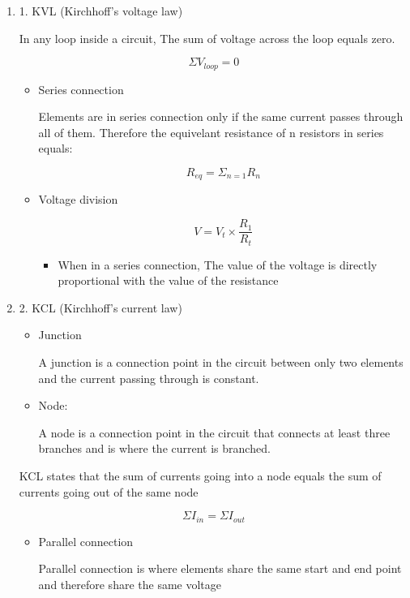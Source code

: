 \documentclass[11pt]{article}
\begin{document}
\begin{enumerate}
\item 1. KVL (Kirchhoff's voltage law)
\label{sec:org2900cc3}

In any loop inside a circuit, The sum of voltage across the loop equals zero.

$$\Sigma V_{loop} = 0$$

\begin{itemize}
\item Series connection

Elements are in series connection only if the same current passes through all of them. Therefore the equivelant resistance of n resistors in series equals:

$$R_{eq} = \Sigma_{n = 1} R_n$$

\item Voltage division

$$V = V_t \times \frac{R_1}{R_t}$$

\begin{itemize}
\item When in a series connection, The value of the voltage is directly proportional with the value of the resistance
\end{itemize}
\end{itemize}
\item 2. KCL (Kirchhoff's current law)
\label{sec:org23c984e}

\begin{itemize}
\item Junction

A junction is a connection point in the circuit between only two elements and the current passing through is constant.

\item Node:

A node is a connection point in the circuit that connects at least three branches and is where the current is branched.
\end{itemize}

KCL states that the sum of currents going into a node equals the sum of currents going out of the same node

$$\Sigma I_{in} = \Sigma I_{out}$$

\begin{itemize}
\item Parallel connection

Parallel connection is where elements share the same start and end point and therefore share the same voltage


\end{itemize}
\end{enumerate}
\end{document}
